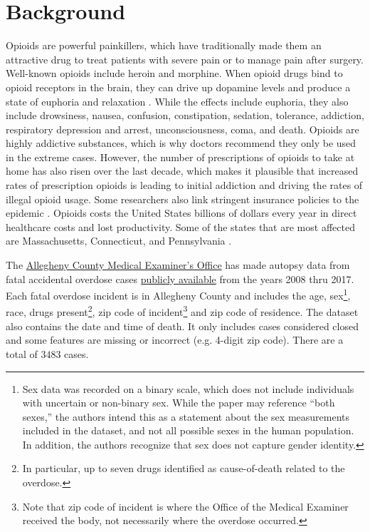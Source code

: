 \documentclass{article}
\begin{document}
\section{Background}
Opioids are powerful painkillers, which have traditionally made them an attractive drug to treat patients with severe pain or to manage pain after surgery. Well-known opioids include heroin and morphine. When opioid drugs bind to opioid receptors in the brain, they can drive up dopamine levels and produce a state of euphoria and relaxation \citep{nids16}. While the effects include euphoria, they also include drowsiness, nausea, confusion, constipation, sedation, tolerance, addiction, respiratory depression and arrest, unconsciousness, coma, and death. Opioids are highly addictive substances, which is why doctors recommend they only be used in the extreme cases. However, the number of prescriptions of opioids to take at home has also risen over the last decade, which makes it plausible that increased rates of prescription opioids is leading to initial addiction and driving the rates of illegal opioid usage. Some researchers also link stringent insurance policies to the epidemic \citep{times17}. Opioids costs the United States billions of dollars every year in direct healthcare costs and lost productivity. Some of the states that are most affected are Massachusetts, Connecticut, and Pennsylvania \citep{hedegaard17}.

The \href{https://www.alleghenycounty.us/medical-examiner/index.aspx}{Allegheny County Medical Examiner's Office} has made autopsy data from fatal accidental overdose cases \href{https://catalog.data.gov/dataset/allegheny-county-fatal-accidental-overdoses}{publicly available} from the years 2008 thru 2017. Each fatal overdose incident is in Allegheny County and includes the age, sex\footnote{Sex data was recorded on a binary scale, which does not include individuals with uncertain or non-binary sex. While the paper may reference ``both sexes,'' the authors intend this as a statement about the sex measurements included in the dataset, and not all possible sexes in the human population. In addition, the authors recognize that sex does not capture gender identity.}, race, drugs present\footnote{In particular, up to seven drugs identified as cause-of-death related to the overdose.}, zip code of incident\footnote{Note that zip code of incident is where the Office of the Medical Examiner received the body, not necessarily where the overdose occurred.} and zip code of residence. The dataset also contains the date and time of death. It only includes cases considered closed and some features are missing or incorrect (e.g. 4-digit zip code). There are a total of $3483$ cases.
\end{document}
